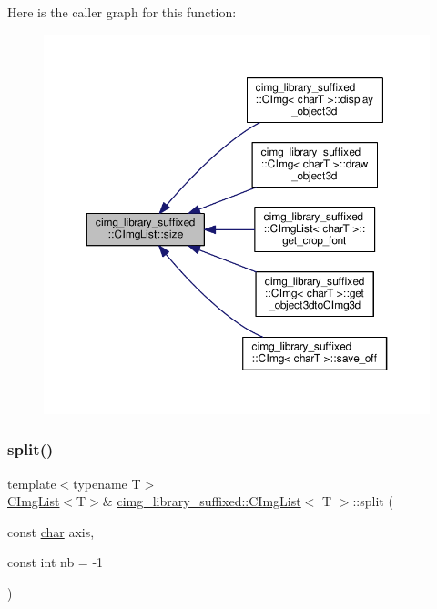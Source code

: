 Here is the caller graph for this function\+:
\nopagebreak
\begin{figure}[H]
\begin{center}
\leavevmode
\includegraphics[width=350pt]{d5/d7e/structcimg__library__suffixed_1_1CImgList_aee903f446b109a60b1107be84f31b01e_icgraph}
\end{center}
\end{figure}
\mbox{\label{structcimg__library__suffixed_1_1CImgList_ab9744c8b1e41678f91de1dc4049aa058}} 
\subsubsection{\texorpdfstring{split()}{split()}}
{\footnotesize\ttfamily template$<$typename T$>$ \\
\hyperlink{structcimg__library__suffixed_1_1CImgList}{C\+Img\+List}$<$T$>$\& \hyperlink{structcimg__library__suffixed_1_1CImgList}{cimg\+\_\+library\+\_\+suffixed\+::\+C\+Img\+List}$<$ T $>$\+::split (\begin{DoxyParamCaption}\item[{const \hyperlink{classchar}{char}}]{axis,  }\item[{const int}]{nb = {\ttfamily -\/1} }\end{DoxyParamCaption})\hspace{0.3cm}{\ttfamily [inline]}}



